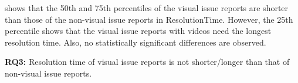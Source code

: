  shows that the 50th and 75th percentiles of the visual issue reports are shorter than those of the non-visual issue reports in ResolutionTime.
However, the 25th percentile shows that the visual issue reports with videos need the longest resolution time. 
Also, no statistically significant differences are observed. 

\summarybox
{{\bf RQ3: }{
    Resolution time of visual issue reports is not shorter/longer than that of non-visual issue reports.
}}




